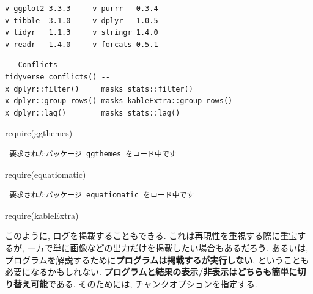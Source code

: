 \documentclass[
]{bxjsbook}
\newenvironment{Shaded}{\begin{snugshade}}{\end{snugshade}}
\newcommand{\FunctionTok}[1]{\textcolor[rgb]{0.00,0.00,0.00}{#1}}
\newcommand{\NormalTok}[1]{#1}
\theoremstyle{definition}
\theoremstyle{definition}
\theoremstyle{definition}
\theoremstyle{remark}
\begin{document}
\begin{verbatim}
v ggplot2 3.3.3     v purrr   0.3.4
v tibble  3.1.0     v dplyr   1.0.5
v tidyr   1.1.3     v stringr 1.4.0
v readr   1.4.0     v forcats 0.5.1
\end{verbatim}

\begin{verbatim}
-- Conflicts ------------------------------------------ tidyverse_conflicts() --
x dplyr::filter()     masks stats::filter()
x dplyr::group_rows() masks kableExtra::group_rows()
x dplyr::lag()        masks stats::lag()
\end{verbatim}

\begin{Shaded}
\begin{Highlighting}[numbers=left,,]
\FunctionTok{require}\NormalTok{(ggthemes)}
\end{Highlighting}
\end{Shaded}

\begin{verbatim}
 要求されたパッケージ ggthemes をロード中です 
\end{verbatim}

\begin{Shaded}
\begin{Highlighting}[numbers=left,,]
\FunctionTok{require}\NormalTok{(equatiomatic)}
\end{Highlighting}
\end{Shaded}

\begin{verbatim}
 要求されたパッケージ equatiomatic をロード中です 
\end{verbatim}

\begin{Shaded}
\begin{Highlighting}[numbers=left,,]
\FunctionTok{require}\NormalTok{(kableExtra)}
\end{Highlighting}
\end{Shaded}

このように, ログを掲載することもできる.
これは再現性を重視する際に重宝するが,
一方で単に画像などの出力だけを掲載したい場合もあるだろう. あるいは,
プログラムを解説するために\textbf{プログラムは掲載するが実行しない},
ということも必要になるかもしれない.
\textbf{プログラムと結果の表示/非表示はどちらも簡単に切り替え可能}である.
そのためには, チャンクオプションを指定する.
\end{document}
